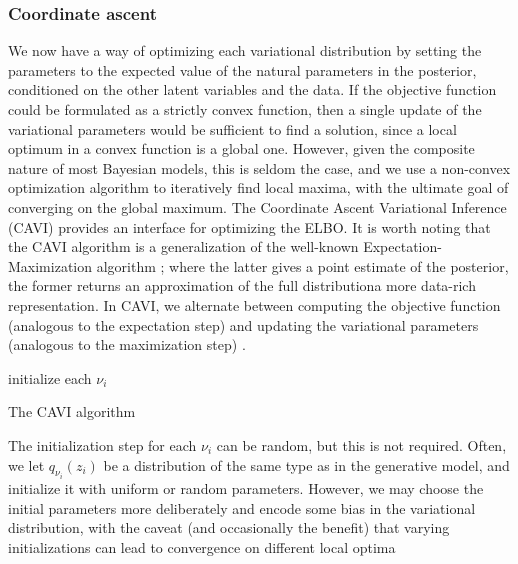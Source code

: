 \documentclass[12pt,letterpaper]{article}
\begin{document}
\subsubsection{Coordinate ascent}
We now have a way of optimizing each variational distribution by setting the parameters to the expected value of the natural parameters in the posterior, conditioned on the other latent variables and the data. If the objective function could be formulated as a strictly convex function, then a single update of the variational parameters would be sufficient to find a solution, since a local optimum in a convex function is a global one. However, given the composite nature of most Bayesian models, this is seldom the case, and we use a non-convex optimization algorithm to iteratively find local maxima, with the ultimate goal of converging on the global maximum. The Coordinate Ascent Variational Inference (CAVI) provides an interface for optimizing the ELBO. It is worth noting that the CAVI algorithm is a generalization of the well-known Expectation-Maximization algorithm \citep{dempster:1977}; where the latter gives a point estimate of the posterior, the former returns an approximation of the full distribution\textemdash a more data-rich representation. In CAVI, we alternate between computing the objective function (analogous to the expectation step) and updating the variational parameters (analogous to the maximization step) \citep{neal:1998}.


\begin{algorithm}[H]
initialize each $\nu_i$ \\
\caption{The CAVI algorithm}

\end{algorithm}

The initialization step for each $\nu_i$ can be random, but this is not required. Often, we let $q_{\nu_i}(z_i)$ be a distribution of the same type as in the generative model, and initialize it with uniform or random parameters. However, we may choose the initial parameters more deliberately and encode some bias in the variational distribution, with the caveat (and occasionally the benefit) that varying initializations can lead to convergence on different local optima \citep{blei:2017}
\end{document}
